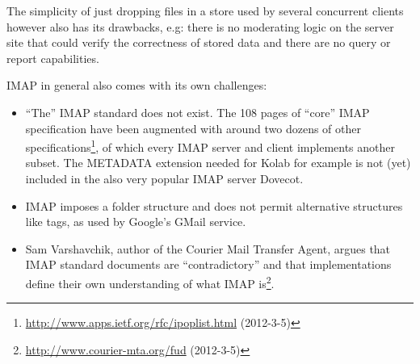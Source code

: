 \documentclass[11pt,a4paper,headsepline,twoside]{scrartcl}		%
\newcommand{\citeurl}[2]{\url{#1} (#2)}
\begin{document}
The simplicity of just dropping files in a store used by several concurrent
clients however also has its drawbacks, e.g: there is no moderating logic on the
server site that could verify the correctness of stored data and there are no
query or report capabilities.

IMAP in general also comes with its own challenges:

\begin{itemize}
\item ``The'' IMAP standard does not exist. The 108 pages of ``core'' IMAP
  specification \cite{RFC3501} have been augmented with around two
  dozens of other
  specifications\footnote{\citeurl{http://www.apps.ietf.org/rfc/ipoplist.html}{2012-3-5}},
  of which every IMAP server and client implements another subset. The METADATA
  extension needed for Kolab for example is not (yet) included in the also very
  popular IMAP server Dovecot.
\item IMAP imposes a folder structure and does not permit alternative structures
  like tags, as used by Google's GMail service.
\item Sam Varshavchik, author of the Courier Mail Transfer Agent, argues that
  IMAP standard documents are ``contradictory'' and that implementations define
  their own understanding of what IMAP
  is\footnote{\citeurl{http://www.courier-mta.org/fud}{2012-3-5}}.
\end{itemize}

\end{document}
